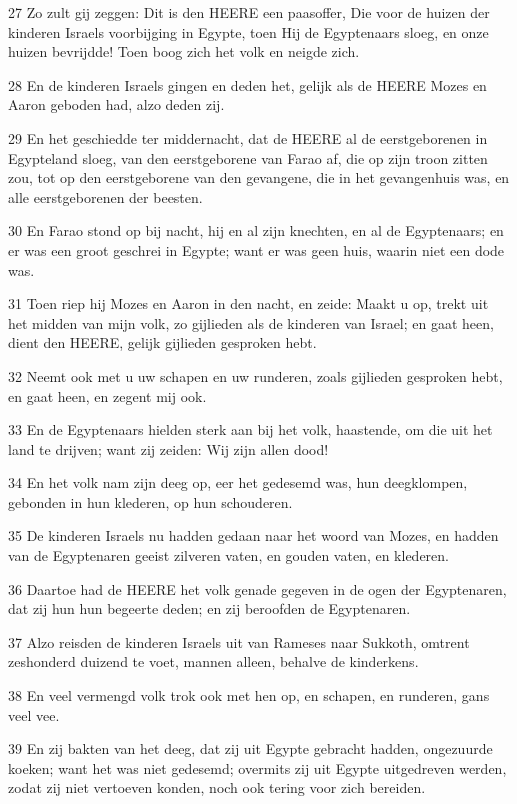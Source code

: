 \par 27 Zo zult gij zeggen: Dit is den HEERE een paasoffer, Die voor de huizen der kinderen Israels voorbijging in Egypte, toen Hij de Egyptenaars sloeg, en onze huizen bevrijdde! Toen boog zich het volk en neigde zich.
\par 28 En de kinderen Israels gingen en deden het, gelijk als de HEERE Mozes en Aaron geboden had, alzo deden zij.
\par 29 En het geschiedde ter middernacht, dat de HEERE al de eerstgeborenen in Egypteland sloeg, van den eerstgeborene van Farao af, die op zijn troon zitten zou, tot op den eerstgeborene van den gevangene, die in het gevangenhuis was, en alle eerstgeborenen der beesten.
\par 30 En Farao stond op bij nacht, hij en al zijn knechten, en al de Egyptenaars; en er was een groot geschrei in Egypte; want er was geen huis, waarin niet een dode was.
\par 31 Toen riep hij Mozes en Aaron in den nacht, en zeide: Maakt u op, trekt uit het midden van mijn volk, zo gijlieden als de kinderen van Israel; en gaat heen, dient den HEERE, gelijk gijlieden gesproken hebt.
\par 32 Neemt ook met u uw schapen en uw runderen, zoals gijlieden gesproken hebt, en gaat heen, en zegent mij ook.
\par 33 En de Egyptenaars hielden sterk aan bij het volk, haastende, om die uit het land te drijven; want zij zeiden: Wij zijn allen dood!
\par 34 En het volk nam zijn deeg op, eer het gedesemd was, hun deegklompen, gebonden in hun klederen, op hun schouderen.
\par 35 De kinderen Israels nu hadden gedaan naar het woord van Mozes, en hadden van de Egyptenaren geeist zilveren vaten, en gouden vaten, en klederen.
\par 36 Daartoe had de HEERE het volk genade gegeven in de ogen der Egyptenaren, dat zij hun hun begeerte deden; en zij beroofden de Egyptenaren.
\par 37 Alzo reisden de kinderen Israels uit van Rameses naar Sukkoth, omtrent zeshonderd duizend te voet, mannen alleen, behalve de kinderkens.
\par 38 En veel vermengd volk trok ook met hen op, en schapen, en runderen, gans veel vee.
\par 39 En zij bakten van het deeg, dat zij uit Egypte gebracht hadden, ongezuurde koeken; want het was niet gedesemd; overmits zij uit Egypte uitgedreven werden, zodat zij niet vertoeven konden, noch ook tering voor zich bereiden.
